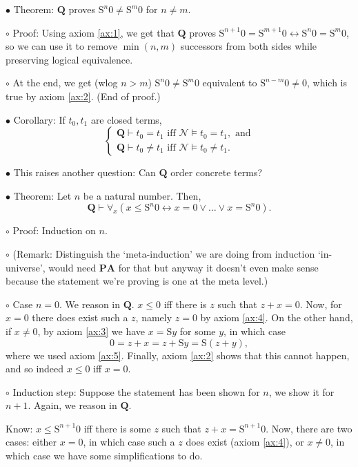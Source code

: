 \documentclass{article}
\newcommand{\RQ}{\mathbf{Q}}
\newcommand{\PA}{\mathbf{PA}}
\newcommand{\TN}{\mathcal{N}}
\newcommand{\suc}{\mathrm{S}}
\newcommand\Point[1]{\noindent \hspace{\labelsep} {
$\bullet$ #1} \smallskip}
\newcommand\point[1]{\noindent \hspace{\labelsep} {\small $\circ$ #1} \smallskip}
\newcommand\timestamp[1]{}
\newcommand\proofend{\hfill(End of proof.)}
\begin{document}
\Point{Theorem: $\RQ$ proves $\suc^n 0 \neq \suc^m 0$ for $n \neq m$.}

\point{Proof: Using axiom \ref{ax:1}, we get that $\RQ$ proves $\suc^{n+1} 0 = \suc^{m+1} 0 \leftrightarrow \suc^n 0 = \suc^m 0$, so we can use it to remove $\min(n,m)$ successors from both sides while preserving logical equivalence.}

\point{At the end, we get (wlog $n>m$) $\suc^n 0 \neq \suc^m 0$ equivalent to $\suc^{n-m} 0 \neq 0$, which is true by axiom \ref{ax:2}.
\proofend}

\Point{Corollary: If $t_0, t_1$ are closed terms,
\begin{equation}
\begin{cases} \RQ \vdash t_0 = t_1 \text{ iff } \TN \vDash t_0 = t_1,\text{ and}\\
\RQ \vdash t_0 \neq t_1 \text{ iff } \TN \vDash t_0 \neq t_1.
\end{cases}
\end{equation}}

\timestamp{22 min}

\Point{This raises another question: Can $\RQ$ order concrete terms?}

\Point{Theorem: Let $n$ be a natural number. Then,
\begin{equation}
\RQ \vdash \forall_x (x \leq \suc^n 0 \leftrightarrow x = 0 \lor \dots \lor x = \suc^n 0).
\end{equation}
}

\point{Proof: Induction on $n$.}

\point{(Remark: Distinguish the `meta-induction' we are doing from induction `in-universe', would need $\PA$ for that but anyway it doesn't even make sense because the statement we're proving is one at the meta level.)}

\point{Case $n = 0$. We reason in $\RQ$. $x \leq 0$ iff there is $z$ such that $z+x = 0$. Now, for $x = 0$ there does exist such a $z$, namely $z = 0$ by axiom \ref{ax:4}. On the other hand, if $x \neq 0$, by axiom \ref{ax:3} we have $x = \suc y$ for some $y$, in which case
\begin{equation}
0 = z+x = z + \suc y = \suc(z+y),
\end{equation}
where we used axiom \ref{ax:5}. Finally, axiom \ref{ax:2} shows that this cannot happen, and so indeed $x \leq 0$ iff $x = 0$.
}

\point{Induction step: Suppose the statement has been shown for $n$, we show it for $n+1$. Again, we reason in $\RQ$.

Know: $x \leq \suc^{n+1}0$ iff there is some $z$ such that $z+x = \suc^{n+1}0$. Now, there are two cases: either $x = 0$, in which case such a $z$ does exist (axiom \ref{ax:4}), or $x \neq 0$, in which case we have some simplifications to do.}
\end{document}
